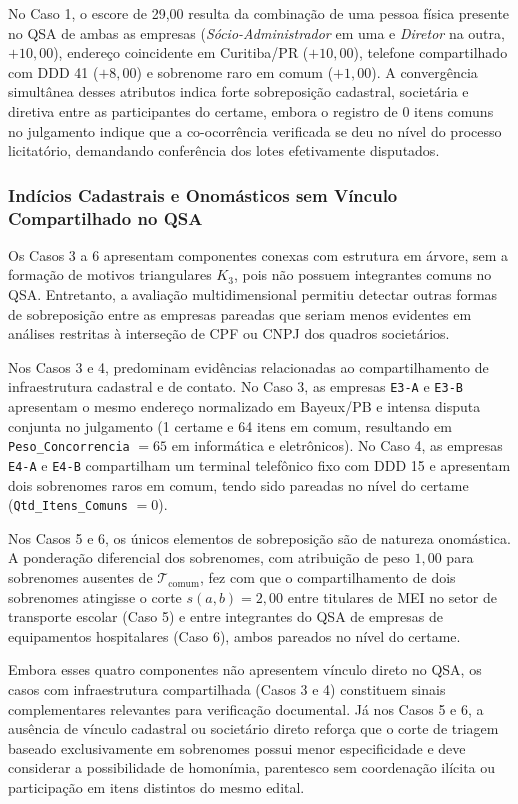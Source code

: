 No Caso 1, o escore de 29{,}00 resulta da combinação de uma pessoa física presente no QSA de ambas as empresas (\textit{Sócio-Administrador} em uma e \textit{Diretor} na outra, $+10{,}00$), endereço coincidente em Curitiba/PR ($+10{,}00$), telefone compartilhado com DDD 41 ($+8{,}00$) e sobrenome raro em comum ($+1{,}00$). A convergência simultânea desses atributos indica forte sobreposição cadastral, societária e diretiva entre as participantes do certame, embora o registro de 0 itens comuns no julgamento indique que a co-ocorrência verificada se deu no nível do processo licitatório, demandando conferência dos lotes efetivamente disputados.

\subsubsection{Indícios Cadastrais e Onomásticos sem Vínculo Compartilhado no QSA}

Os Casos 3 a 6 apresentam componentes conexas com estrutura em árvore, sem a formação de motivos triangulares $K_3$, pois não possuem integrantes comuns no QSA. Entretanto, a avaliação multidimensional permitiu detectar outras formas de sobreposição entre as empresas pareadas que seriam menos evidentes em análises restritas à interseção de CPF ou CNPJ dos quadros societários.

Nos Casos 3 e 4, predominam evidências relacionadas ao compartilhamento de infraestrutura cadastral e de contato. No Caso 3, as empresas \texttt{E3-A} e \texttt{E3-B} apresentam o mesmo endereço normalizado em Bayeux/PB e intensa disputa conjunta no julgamento (1 certame e 64 itens em comum, resultando em \texttt{Peso\_Concorrencia} $= 65$ em informática e eletrônicos). No Caso 4, as empresas \texttt{E4-A} e \texttt{E4-B} compartilham um terminal telefônico fixo com DDD 15 e apresentam dois sobrenomes raros em comum, tendo sido pareadas no nível do certame (\texttt{Qtd\_Itens\_Comuns} $= 0$).

Nos Casos 5 e 6, os únicos elementos de sobreposição são de natureza onomástica. A ponderação diferencial dos sobrenomes, com atribuição de peso $1{,}00$ para sobrenomes ausentes de $\mathcal{T}_{\mathrm{comum}}$, fez com que o compartilhamento de dois sobrenomes atingisse o corte $s(a,b) = 2{,}00$ entre titulares de MEI no setor de transporte escolar (Caso 5) e entre integrantes do QSA de empresas de equipamentos hospitalares (Caso 6), ambos pareados no nível do certame.

Embora esses quatro componentes não apresentem vínculo direto no QSA, os casos com infraestrutura compartilhada (Casos 3 e 4) constituem sinais complementares relevantes para verificação documental. Já nos Casos 5 e 6, a ausência de vínculo cadastral ou societário direto reforça que o corte de triagem baseado exclusivamente em sobrenomes possui menor especificidade e deve considerar a possibilidade de homonímia, parentesco sem coordenação ilícita ou participação em itens distintos do mesmo edital.
